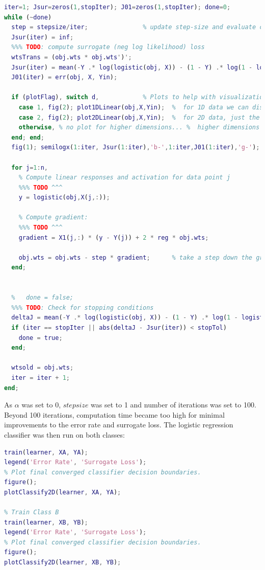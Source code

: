 \documentclass[]{report}   %
\begin{document}
\begin{lstlisting}[language=Matlab, caption=Full train.m implementation.]
% Training loop (SGD):
iter=1; Jsur=zeros(1,stopIter); J01=zeros(1,stopIter); done=0; 
while (~done) 
  step = stepsize/iter;               % update step-size and evaluate current loss values
  Jsur(iter) = inf;   
  %%% TODO: compute surrogate (neg log likelihood) loss
  wtsTrans = (obj.wts * obj.wts')';
  Jsur(iter) = mean(-Y .* log(logistic(obj, X)) - (1 - Y) .* log(1 - logistic(obj, X)) + reg * sum(wtsTrans));
  J01(iter) = err(obj, X, Yin);

  if (plotFlag), switch d,            % Plots to help with visualization
    case 1, fig(2); plot1DLinear(obj,X,Yin);  %  for 1D data we can display the data and the function
    case 2, fig(2); plot2DLinear(obj,X,Yin);  %  for 2D data, just the data and decision boundary
    otherwise, % no plot for higher dimensions... %  higher dimensions visualization is hard
  end; end;
  fig(1); semilogx(1:iter, Jsur(1:iter),'b-',1:iter,J01(1:iter),'g-'); drawnow;

  for j=1:n,
    % Compute linear responses and activation for data point j
    %%% TODO ^^^
    y = logistic(obj,X(j,:));

    % Compute gradient:
    %%% TODO ^^^
    gradient = X1(j,:) * (y - Y(j)) + 2 * reg * obj.wts;

    obj.wts = obj.wts - step * gradient;      % take a step down the gradient
  end;


  %   done = false;
  %%% TODO: Check for stopping conditions
  deltaJ = mean(-Y .* log(logistic(obj, X)) - (1 - Y) .* log(1 - logistic(obj, X)) + reg * obj.wts * obj.wts');  
  if (iter == stopIter || abs(deltaJ - Jsur(iter)) < stopTol)
    done = true;
  end;

  wtsold = obj.wts;
  iter = iter + 1;
end;
\end{lstlisting}
{ As $\alpha$ was set to 0, $stepsize$ was set to 1 and number of iterations was set to 100. Beyond 100 iterations, computation time became too high for minimal improvements to the error  rate and surrogate loss. The logistic regression classifier was then run on both classes:}
\begin{lstlisting}[language=Matlab, caption=Code to run logistic regression classifier on both data sets.]
% Train Class A
train(learner, XA, YA);
legend('Error Rate', 'Surrogate Loss');
% Plot final converged classifier decision boundaries.
figure();
plotClassify2D(learner, XA, YA);

% Train Class B
train(learner, XB, YB);
legend('Error Rate', 'Surrogate Loss');
% Plot final converged classifier decision boundaries.
figure();
plotClassify2D(learner, XB, YB);
\end{lstlisting}
\end{document}
